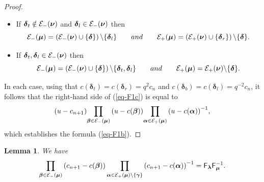 \documentclass[11pt]{article}
\newcommand{\lam}{\boldsymbol{\lambda}}
\newcommand{\num}{\boldsymbol{\nu}}
\newcommand{\mum}{\boldsymbol{\mu}}
\newcommand{\alm}{\boldsymbol{\alpha}}
\newcommand{\bem}{\boldsymbol{\beta}}
\newcommand{\gam}{\boldsymbol{\gamma}}
\newcommand{\dem}{\boldsymbol{\delta}}
\newtheorem{Lemma}[Theorem]{Lemma}
\begin{document}
\begin{proof}
\begin{itemize}
\item If $\dem_t\notin {\cal{E}}_-(\num)$ and $\dem_l\in {\cal{E}}_-(\num)$ then \[{\cal{E}}_-(\mum)=\left({\cal{E}}_-(\num)\cup\{\dem\}\right)\backslash\{\dem_l\}\qquad\textrm{and}\qquad {\cal{E}}_+(\mum)=\left({\cal{E}}_+(\num)\cup\{\dem_r\}\right)\backslash\{\dem\}  .\]

\item If $\dem_t,\dem_l\in {\cal{E}}_-(\num)$ then \[{\cal{E}}_-(\mum)=\left({\cal{E}}_-(\num)\cup\{\dem\}\right)\backslash\{\dem_t,\dem_l\}\qquad\textrm{and}\qquad {\cal{E}}_+(\mum)={\cal{E}}_+(\num)\backslash\{\dem\}  .\]
\end{itemize}
In each case,
using that $c(\dem_t)=c(\dem_r)=q^2c_n$ and $c(\dem_b)=c(\dem_l)=q^{-2}c_n$,
it follows that the right-hand side of (\ref{eq-F1c}) is equal to
\[(u-c_{n+1}) {\prod_{\bem\in {\cal{E}}_-(\mum)}\left(u-c(\bem)\right)} {\prod_{\alm\in {\cal{E}}_+(\mum)}\left(u-c(\alm)\right)^{-1}} ,
\]
which establishes the formula (\ref{eq-F1b}).
\end{proof}

\begin{Lemma}\label{lemm-f1}
We have
\begin{gather*}%
\prod_{\bem\in {\cal{E}}_-(\mum)}\left(c_{n+1}-c(\bem)\right)\prod_{\alm\in {\cal{E}}_+(\mum)\backslash\{\gam\}}\left(c_{n+1}-c(\alm)\right)^{-1}=\mathsf{F}_{\lam} \mathsf{F}_{\mum}^{-1}  .
\end{gather*}
\end{Lemma}
\end{document}
